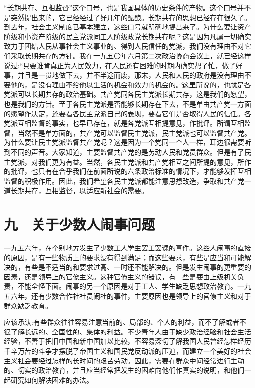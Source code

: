 “长期共存、互相监督”这个口号，也是我国具体的历史条件的产物。这个口号并不是突然提出来的，它已经经过了好几年的酝酿。长期共存的思想已经存在很久了。到去年，社会主义制度已基本建立，这些口号就明确地提出来了。为什么要让资产阶级和小资产阶级的民主党派同工人阶级政党长期共存呢？这是因为凡属一切确实致力于团结人民从事社会主义事业的、得到人民信任的党派，我们没有理由不对它们采取长期共存的方针。我在一九五〇年六月第二次政治协商会议上，就已经这样说过:“只要谁肯真正为人民效力，在人民还有困难的时期内确实帮了忙，做了好事，并且是一贯地做下去，并不半途而废，那末，人民和人民的政府是没有理由不要他的，是没有理由不给他以生活的机会和效力的机会的。”这里所说的，也就是各党派可以长期共存的政治基础。共产党同各民主党派长期共存，这是我们的愿望，也是我们的方针。至于各民主党派是否能够长期存在下去，不是单由共产党一方面的愿望作决定，还要看各民主党派自己的表现，要看它们是否取得人民的信任。各党派互相监督的事实，也早已存在，就是各党派互相提意见，作批评。所谓互相监督，当然不是单方面的，共产党可以监督民主党派，民主党派也可以监督共产党。为什么要让民主党派监督共产党呢？这是因为一个党同一个人一样，耳边很需要听到不同的声音。大家知道，主要监督共产党的是劳动人民和党员群众。但是有了民主党派，对我们更为有益。当然，各民主党派和共产党相互之间所提的意见，所作的批评，也只有在合乎我们在前面所说的六条政治标准的情况下，才能够发挥互相监督的积极作用。因此，我们希望各民主党派都能注意思想改造，争取和共产党一道长期共存，互相监督，以适应新社会的需要。

\section{九　关于少数人闹事问题}

一九五六年，在个别地方发生了少数工人学生罢工罢课的事件。这些人闹事的直接的原因，是有一些物质上的要求没有得到满足；而这些要求，有些是应当和可能解决的，有些是不适当的和要求过高、一时还不能解决的。但是发生闹事的更重要的因素，还是领导上的官僚主义。这种官僚主义的错误，有一些是要由上级机关负责，不能全怪下面。闹事的另一个原因是对于工人、学生缺乏思想政治教育。一九五六年，还有少数合作社社员闹社的事件，主要原因也是领导上的官僚主义和对于群众缺乏教育。

应该承认:有些群众往往容易注意当前的、局部的、个人的利益，而不了解或者不很了解长远的、全国性的、集体的利益。不少青年人由于缺少政治经验和社会生活经验，不善于把旧中国和新中国加以比较，不容易深切了解我国人民曾经怎样经历千辛万苦的斗争才摆脱了帝国主义和国民党反动派的压迫，而建立一个美好的社会主义社会要经过怎样的长时间的艰苦劳动。因此，需要在群众中间经常进行生动的、切实的政治教育，并且应当经常把发生的困难向他们作真实的说明，和他们一起研究如何解决困难的办法。

